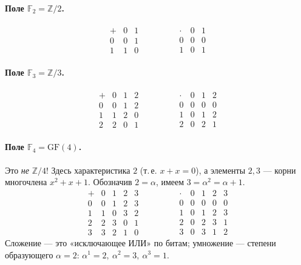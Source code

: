 \documentclass[11pt]{article}
\newcommand{\F}{\mathbb{F}}
\begin{document}
\paragraph{Поле $\F_2=\mathbb{Z}/2$.}
\[
\begin{array}{c|cc}
+ & 0 & 1\\\hline
0 & 0 & 1\\
1 & 1 & 0
\end{array}
\qquad\qquad
\begin{array}{c|cc}
\cdot & 0 & 1\\\hline
0 & 0 & 0\\
1 & 0 & 1
\end{array}
\]

\paragraph{Поле $\F_3=\mathbb{Z}/3$.}
\[
\begin{array}{c|ccc}
+ & 0 & 1 & 2\\\hline
0 & 0 & 1 & 2\\
1 & 1 & 2 & 0\\
2 & 2 & 0 & 1
\end{array}
\qquad\qquad
\begin{array}{c|ccc}
\cdot & 0 & 1 & 2\\\hline
0 & 0 & 0 & 0\\
1 & 0 & 1 & 2\\
2 & 0 & 2 & 1
\end{array}
\]

\paragraph{Поле $\F_4=\mathrm{GF}(4)$.}
Это \emph{не} $\mathbb{Z}/4$! Здесь характеристика $2$ (т.\,е. $x+x=0$), а элементы
$2,3$ — корни многочлена $x^2+x+1$. Обозначив $2=\alpha$, имеем $3=\alpha^2=\alpha+1$.
\[
\begin{array}{c|cccc}
+ & 0 & 1 & 2 & 3\\\hline
0 & 0 & 1 & 2 & 3\\
1 & 1 & 0 & 3 & 2\\
2 & 2 & 3 & 0 & 1\\
3 & 3 & 2 & 1 & 0
\end{array}
\qquad\qquad
\begin{array}{c|cccc}
\cdot & 0 & 1 & 2 & 3\\\hline
0 & 0 & 0 & 0 & 0\\
1 & 0 & 1 & 2 & 3\\
2 & 0 & 2 & 3 & 1\\
3 & 0 & 3 & 1 & 2
\end{array}
\]
Сложение — это «исключающее ИЛИ» по битам; умножение — степени образующего $\alpha=2$:
$\alpha^1=2,\ \alpha^2=3,\ \alpha^3=1$.
\end{document}
